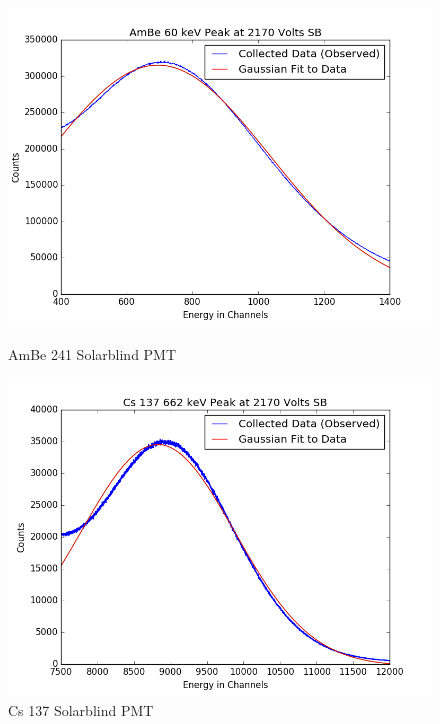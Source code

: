 \documentclass{article}
\begin{document}
\begin{figure}[H]
  \centering
  \begin{minipage}[b]{0.4\textwidth}
    \includegraphics[width=\textwidth]{SBAmBefit.png}
    \caption{AmBe 241 Solarblind PMT}
  \end{minipage}
  \hfill
  \begin{minipage}[b]{0.4\textwidth}
    \includegraphics[width=\textwidth]{SBCsfit.png}
    \caption{Cs 137 Solarblind PMT}
  \end{minipage}
\end{figure}

\end{document}
